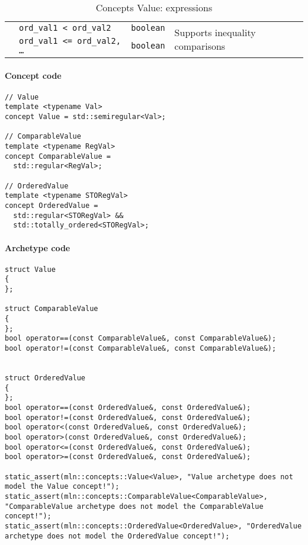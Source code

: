 \begin{table}[H]
\begin{scriptsize}
\begin{tabular}{llll}
      \multicolumn{1}{c|}{}                                 & \texttt{ord\_val1 < ord\_val2}                                       & \texttt{boolean}
                                                            & \multicolumn{1}{l}{\multirow{2}{*}{Supports inequality comparisons}}                    \\
      \multicolumn{1}{c|}{}                                 & \texttt{ord\_val1 <= ord\_val2, \dots}                               & \texttt{boolean}
                                                            & \multicolumn{1}{l}{}                                                                    \\
      \cline{1-4}
    \end{tabular}
    \smallskip

    \caption{Concepts Value: expressions}
  \end{scriptsize}
  \label{table:concept.value.expressions}
\end{table}

\paragraph{Concept code}
\begin{verbatim}
// Value
template <typename Val>
concept Value = std::semiregular<Val>;

// ComparableValue
template <typename RegVal>
concept ComparableValue =
  std::regular<RegVal>;

// OrderedValue
template <typename STORegVal>
concept OrderedValue =
  std::regular<STORegVal> &&
  std::totally_ordered<STORegVal>;
\end{verbatim}

\paragraph{Archetype code}

\begin{verbatim}
struct Value
{
};

struct ComparableValue
{
};
bool operator==(const ComparableValue&, const ComparableValue&);
bool operator!=(const ComparableValue&, const ComparableValue&);


struct OrderedValue
{
};
bool operator==(const OrderedValue&, const OrderedValue&);
bool operator!=(const OrderedValue&, const OrderedValue&);
bool operator<(const OrderedValue&, const OrderedValue&);
bool operator>(const OrderedValue&, const OrderedValue&);
bool operator<=(const OrderedValue&, const OrderedValue&);
bool operator>=(const OrderedValue&, const OrderedValue&);

static_assert(mln::concepts::Value<Value>, "Value archetype does not model the Value concept!");
static_assert(mln::concepts::ComparableValue<ComparableValue>, "ComparableValue archetype does not model the ComparableValue concept!");
static_assert(mln::concepts::OrderedValue<OrderedValue>, "OrderedValue archetype does not model the OrderedValue concept!");
\end{verbatim}


